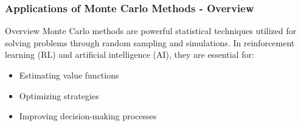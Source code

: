 \documentclass[aspectratio=169]{beamer}
\begin{document}
\begin{frame}[fragile]
    \frametitle{Applications of Monte Carlo Methods - Overview}
    \begin{block}{Overview}
        Monte Carlo methods are powerful statistical techniques utilized for solving problems through random sampling and simulations. 
        In reinforcement learning (RL) and artificial intelligence (AI), they are essential for:
        \begin{itemize}
            \item Estimating value functions
            \item Optimizing strategies
            \item Improving decision-making processes
        \end{itemize}
    \end{block}
\end{frame}
\end{document}
